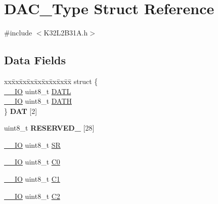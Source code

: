 \hypertarget{struct_d_a_c___type}{}\section{D\+A\+C\+\_\+\+Type Struct Reference}
\label{struct_d_a_c___type}


{\ttfamily \#include $<$K32\+L2\+B31\+A.\+h$>$}

\subsection*{Data Fields}
\begin{DoxyCompactItemize}
\item 
\mbox{\label{struct_d_a_c___type_a0399b3ab7c38d9be3737c9ff683abccd}} 
\begin{tabbing}
xx\=xx\=xx\=xx\=xx\=xx\=xx\=xx\=xx\=\kill
struct \{\\
\>\mbox{\hyperlink{core__cm0plus_8h_aec43007d9998a0a0e01faede4133d6be}{\_\_IO}} uint8\_t \mbox{\hyperlink{struct_d_a_c___type_a2727b3fe1ebf5d8aa026f51a4857e293}{DATL}}\\
\>\mbox{\hyperlink{core__cm0plus_8h_aec43007d9998a0a0e01faede4133d6be}{\_\_IO}} uint8\_t \mbox{\hyperlink{struct_d_a_c___type_ab715ae4b8d7a52b050b97bb1048fc2a2}{DATH}}\\
\} {\bfseries DAT} \mbox{[}2\mbox{]}\\

\end{tabbing}\item 
\mbox{\label{struct_d_a_c___type_abc36545658b11a98b00c51de3a3c5d42}} 
uint8\+\_\+t {\bfseries R\+E\+S\+E\+R\+V\+E\+D\+\_} \mbox{[}28\mbox{]}
\item 
\mbox{\hyperlink{core__cm0plus_8h_aec43007d9998a0a0e01faede4133d6be}{\+\_\+\+\_\+\+IO}} uint8\+\_\+t \mbox{\hyperlink{struct_d_a_c___type_a5634132d0d636b9eac05627fe9e2b2f9}{SR}}
\item 
\mbox{\hyperlink{core__cm0plus_8h_aec43007d9998a0a0e01faede4133d6be}{\+\_\+\+\_\+\+IO}} uint8\+\_\+t \mbox{\hyperlink{struct_d_a_c___type_a0efd9120430014bffb829dea9ae59849}{C0}}
\item 
\mbox{\hyperlink{core__cm0plus_8h_aec43007d9998a0a0e01faede4133d6be}{\+\_\+\+\_\+\+IO}} uint8\+\_\+t \mbox{\hyperlink{struct_d_a_c___type_ad54aa92be9fc988e74d55d2d3daae8ad}{C1}}
\item 
\mbox{\hyperlink{core__cm0plus_8h_aec43007d9998a0a0e01faede4133d6be}{\+\_\+\+\_\+\+IO}} uint8\+\_\+t \mbox{\hyperlink{struct_d_a_c___type_a4f920936a8fc32483b3ebd9b0674b450}{C2}}
\end{DoxyCompactItemize}


